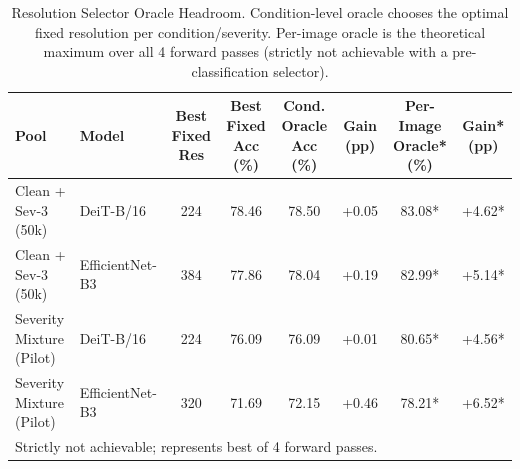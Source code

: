 \begin{table}[t]
\centering
\caption{Resolution Selector Oracle Headroom. Condition-level oracle chooses the optimal fixed resolution per condition/severity. Per-image oracle is the theoretical maximum over all 4 forward passes (strictly not achievable with a pre-classification selector).}
\label{tab:oracle_headroom}
\small
\begin{tabular}{llcccccc}
\toprule
Pool & Model & Best Fixed Res & Best Fixed Acc (\%) & Cond. Oracle Acc (\%) & Gain (pp) & Per-Image Oracle* (\%) & Gain* (pp) \\
\midrule
Clean + Sev-3 (50k) & DeiT-B/16 & 224 & 78.46 & 78.50 & +0.05 & 83.08* & +4.62* \\
Clean + Sev-3 (50k) & EfficientNet-B3 & 384 & 77.86 & 78.04 & +0.19 & 82.99* & +5.14* \\
Severity Mixture (Pilot) & DeiT-B/16 & 224 & 76.09 & 76.09 & +0.01 & 80.65* & +4.56* \\
Severity Mixture (Pilot) & EfficientNet-B3 & 320 & 71.69 & 72.15 & +0.46 & 78.21* & +6.52* \\
\bottomrule
\multicolumn{8}{l}{\footnotesize *Strictly not achievable; represents best of 4 forward passes.}
\end{tabular}
\end{table}